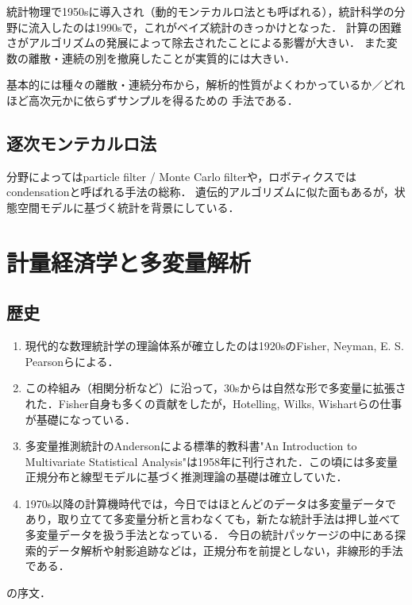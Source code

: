\documentclass[uplatex,dvipdfmx]{jsreport}
\begin{document}
\begin{history}
    統計物理で1950sに導入され（動的モンテカルロ法とも呼ばれる），統計科学の分野に流入したのは1990sで，これがベイズ統計のきっかけとなった．
    計算の困難さがアルゴリズムの発展によって除去されたことによる影響が大きい．
    また変数の離散・連続の別を撤廃したことが実質的には大きい．
\end{history}

基本的には種々の離散・連続分布から，解析的性質がよくわかっているか／どれほど高次元かに依らずサンプルを得るための
手法である．

\section{逐次モンテカルロ法}

\begin{history}
    分野によってはparticle filter / Monte Carlo filterや，ロボティクスではcondensationと呼ばれる手法の総称．
    遺伝的アルゴリズムに似た面もあるが，状態空間モデルに基づく統計を背景にしている．
\end{history}

\chapter{計量経済学と多変量解析}

\section{歴史}

\begin{enumerate}
    \item 現代的な数理統計学の理論体系が確立したのは1920sのFisher, Neyman, E. S. Pearsonらによる．
    \item この枠組み（相関分析など）に沿って，30sからは自然な形で多変量に拡張された．Fisher自身も多くの貢献をしたが，Hotelling, Wilks, Wishartらの仕事が基礎になっている．
    \item 多変量推測統計のAndersonによる標準的教科書"An Introduction to Multivariate Statistical Analysis"は1958年に刊行された．この頃には多変量正規分布と線型モデルに基づく推測理論の基礎は確立していた．
    \item 1970s以降の計算機時代では，今日ではほとんどのデータは多変量データであり，取り立てて多変量分析と言わなくても，新たな統計手法は押し並べて多変量データを扱う手法となっている．
    今日の統計パッケージの中にある探索的データ解析や射影追跡などは，正規分布を前提としない，非線形的手法である．
\end{enumerate}
\cite{フロンティア１}の序文．
\end{document}
